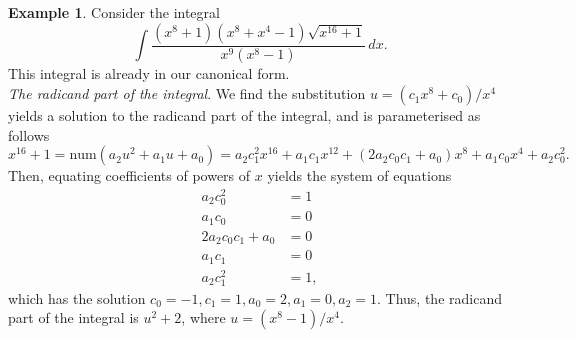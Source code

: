\documentclass[12pt]{article}
\numberwithin{equation}{section}
\theoremstyle{definition}
\newtheorem{example}{Example}[section]
\begin{document}
\iffalse
\begin{example}
Consider the integral $$\int \frac{\left(x^8+1\right) \left(x^8+x^4-1\right) \sqrt{x^{16}+1}}{x^9 \left(x^8-1\right)} \, dx.$$ 
This integral is already in our canonical form. \\

\noindent\textit{The radicand part of the integral}. We find the substitution 
$u=\left(c_1 x^8+c_0\right)/x^4$ yields a solution to the radicand part of 
the integral, and is parameterised as follows
$$x^{16}+1 = \text{num}\left(a_2u^2+a_1u+a_0\right) = 
a_2 c_1^2 x^{16} + a_1 c_1 x^{12} + \left(2 a_2 c_0 c_1+a_0\right)x^8 + a_1 c_0 x^4 + a_2 c_0^2.$$
Then, equating coefficients of powers of $x$ yields the system of equations
\begin{align*}
 a_2 c_0^2  &= 1\\
 a_1 c_0 &= 0\\
 2 a_2 c_0 c_1+a_0 &= 0\\
 a_1 c_1 &= 0\\
 a_2 c_1^2 &= 1,
\end{align*}
which has the solution $c_0=-1,c_1=1,a_0=2,a_1=0,a_2=1$. Thus, the radicand part of the 
integral is $u^2+2$, where $u=\left(x^8-1\right)/x^4$. \\


\end{example}
\end{document}
